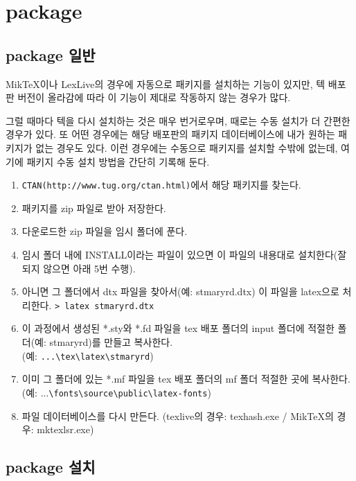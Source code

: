 
\newpage
\chapter{package}
 
\newpage
\section{package 일반}

	MikTeX이나 LexLive의 경우에 자동으로 패키지를 설치하는 기능이 있지만, 텍 배포판 버전이 올라감에 따라 
	이 기능이 제대로 작동하지 않는 경우가 많다.
	
	  그럴 때마다 텍을 다시 설치하는 것은 매우 번거로우며, 때로는 수동 설치가 더 간편한 경우가 있다. 
	  또 어떤 경우에는 해당 배포판의 패키지 데이터베이스에 내가 원하는 패키지가 없는 경우도 있다. 
	  이런 경우에는 수동으로 패키지를 설치할 수밖에 없는데, 여기에 패키지 수동 설치 방법을 간단히 기록해 둔다.

	\begin{enumerate}
	\item 	\verb|CTAN(http://www.tug.org/ctan.html)|에서 해당 패키지를 찾는다.
	\item  	패키지를 zip 파일로 받아 저장한다.
	\item  	다운로드한 zip 파일을 임시 폴더에 푼다.
	\item 	임시 폴더 내에 INSTALL이라는 파일이 있으면 이 파일의 내용대로 설치한다(잘 되지 않으면 아래 5번 수행).
	\item 	아니면 그 폴더에서 dtx 파일을 찾아서(예: stmaryrd.dtx) 이 파일을 latex으로 처리한다.
			\verb|> latex stmaryrd.dtx|
	\item 	이 과정에서 생성된 *.sty와 *.fd 파일을 tex 배포 폴더의 input 폴더에 적절한 폴더(예: stmaryrd)를 만들고 복사한다.\\
			(예: \verb|...\tex\latex\stmaryrd|)
	\item 	이미 그 폴더에 있는 *.mf 파일을 tex 배포 폴더의 mf 폴더 적절한 곳에 복사한다. \\
			(예: ...\verb|\fonts\source\public\latex-fonts|)
	\item 	파일 데이터베이스를 다시 만든다.
			(texlive의 경우: texhash.exe / MikTeX의 경우: mktexlsr.exe)
	\end{enumerate}
			
\newpage
\section{package 설치}



